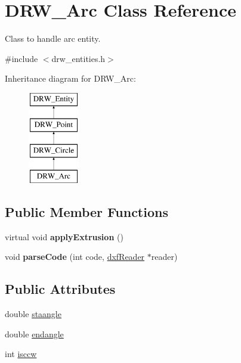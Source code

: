 \hypertarget{classDRW__Arc}{\section{D\-R\-W\-\_\-\-Arc Class Reference}
\label{classDRW__Arc}
}


Class to handle arc entity.  




{\ttfamily \#include $<$drw\-\_\-entities.\-h$>$}

Inheritance diagram for D\-R\-W\-\_\-\-Arc\-:\begin{figure}[H]
\begin{center}
\leavevmode
\includegraphics[height=4.000000cm]{classDRW__Arc}
\end{center}
\end{figure}
\subsection*{Public Member Functions}
\begin{DoxyCompactItemize}
\item 
\hypertarget{classDRW__Arc_a6a504d8ce79af8917d7a59860cfcd0cc}{virtual void {\bfseries apply\-Extrusion} ()}\label{classDRW__Arc_a6a504d8ce79af8917d7a59860cfcd0cc}

\item 
\hypertarget{classDRW__Arc_a837c22a41f1b3eff3c64b10faff85de5}{void {\bfseries parse\-Code} (int code, \hyperlink{classdxfReader}{dxf\-Reader} $\ast$reader)}\label{classDRW__Arc_a837c22a41f1b3eff3c64b10faff85de5}

\end{DoxyCompactItemize}
\subsection*{Public Attributes}
\begin{DoxyCompactItemize}
\item 
double \hyperlink{classDRW__Arc_a7718d55eb1ddd3c4038be5798f37570e}{staangle}
\item 
double \hyperlink{classDRW__Arc_a3425163b91e875fc7ffad0176e0e8183}{endangle}
\item 
int \hyperlink{classDRW__Arc_aaacaac1262bc3e4a2e83c13804d1cb00}{isccw}
\end{DoxyCompactItemize}
